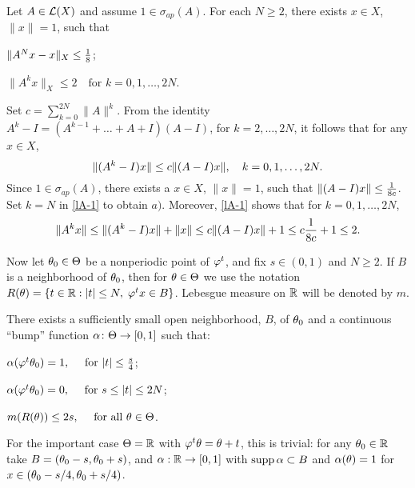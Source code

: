 \begin{lem}
Let $A\in {\cal{L}}(X)$ and assume $1\in\sigma_{ap}(A)$. For each
$N\ge 2$, there exists $x\in X$, $\|x\|=1$, such that
\begin{list}{)}{}
\item $\|A^Nx-x\|_X\le {1 \over 8}$;
\item $\|A^kx\|_X\le 2 \quad\text{for } k=0,1,\ldots,2N$.
\end{list} \end{lem}

\begin{pf}  Set $c=\sum^{2N}_{k=0}\|A\|^k$.  From the
identity $A^k-I=(A^{k-1}+\ldots + A+I) (A-I)$, for
$k=2,\ldots, 2N$, it follows that for any $x\in X$,
\begin{equation}\lb{lA-1}
\|(A^k-I)x\| \le c\|(A-I) x\|, \quad k=0,1,\ldots,2N.
\end{equation}
Since $1\in \sigma_{ap}(A)$, there exists a $x\in X$, $\|x\|=1$,
such that $\|(A-I)x\|\le {1\over 8c}$.
Set $k=N$ in \eqref{lA-1} to obtain $a)$.
Moreover, \eqref{lA-1} shows that for $k=0,1,\ldots,2N$,
\[ \|A^kx\| \le \|(A^k-I)x\|+\|x\|
\le c\|(A-I)x\| + 1 \le c{1\over 8c}+1 \le 2. \]
\end{pf}

Now let $\theta_0\in \Theta$ be a nonperiodic point of $\varphi^t$, and
fix $s\in(0,1)$ and $N\ge 2$.  If $B$ is a neighborhood of $\theta_0$,
then for $\theta\in \Theta$  we use the notation $R(\theta)=\{t\in {\Bbb{R}}:
|t|\le N, \; \varphi^tx\in B \}$. Lebesgue measure on ${\Bbb{R}}$ will be
denoted by $m$.


\begin{lem}  There exists a sufficiently small open
neighborhood, $B$, of $\theta_0$ and a continuous ``bump'' function
$\alpha\colon \Theta\to[0,1]$ such that:
\begin{list}{)}{}
\item  $\alpha(\varphi^t\theta_0)=1, \quad\text{ for }|t|\le{s\over 4}$;
\item  $\alpha(\varphi^t\theta_0)=0, \quad\text{ for } s\le |t|\le 2N$;
\item  $m(R(\theta)) \le 2s, \quad\text{ for all } \theta\in \Theta$.
\end{list}
\end{lem}

For the important case $\Theta={\Bbb{R}}$ with $\varphi^t\theta=\theta+t$, this is
trivial: for any $\theta_0\in{\Bbb{R}}$ take $B=(\theta_0-s,\theta_0+s)$, and
$\alpha:{\Bbb{R}}\to [0,1]$ with $\operatorname{supp}\alpha\subset B$ and $\alpha(\theta)=1$
for $x\in (\theta_0-s/4,\theta_0+s/4)$.

